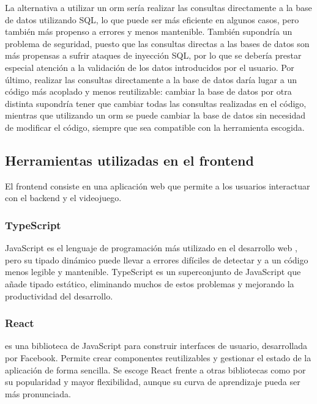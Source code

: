 La alternativa a utilizar un \gls{orm} sería realizar las consultas directamente a la base de datos
utilizando SQL, lo que puede ser más eficiente en algunos casos, pero también más propenso a errores
y menos mantenible. También supondría un problema de seguridad, puesto que las consultas directas a las
bases de datos son más propensas a sufrir ataques de inyección SQL, por lo que se debería prestar
especial atención a la validación de los datos introducidos por el usuario. Por último, realizar las
consultas directamente a la base de datos daría lugar a un código más acoplado y menos reutilizable:
cambiar la base de datos por otra distinta supondría tener que cambiar todas las consultas realizadas
en el código, mientras que utilizando un \gls{orm} se puede cambiar la base de datos sin necesidad de
modificar el código, siempre que sea compatible con la herramienta escogida.

\subsection{Herramientas utilizadas en el frontend}
\label{c08:subsec:herramientas-frontend}
El \gls{frontend} consiste en una aplicación web que permite a los usuarios interactuar con el
\gls{backend} y el videojuego.

\subsubsection{TypeScript}
\label{c08:subsubsec:typescript}
JavaScript es el lenguaje de programación más utilizado en el desarrollo web
\parencite{encuestaTecnologias2024}, pero su tipado dinámico puede llevar a errores difíciles de
detectar y a un código menos legible y mantenible. TypeScript es un superconjunto de JavaScript que
añade tipado estático, eliminando muchos de estos problemas y mejorando la productividad del
desarrollo.

\subsubsection{React}
\label{c08:subsubsec:react}
 es una biblioteca de JavaScript para construir interfaces de usuario,
desarrollada por Facebook. Permite crear componentes reutilizables y gestionar el estado de la aplicación
de forma sencilla. Se escoge React frente a otras bibliotecas como  por su
popularidad y mayor flexibilidad, aunque su curva de aprendizaje pueda ser más pronunciada.

